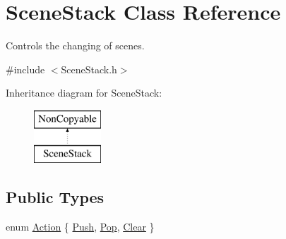 \hypertarget{class_scene_stack}{}\section{Scene\+Stack Class Reference}
\label{class_scene_stack}


Controls the changing of scenes.  




{\ttfamily \#include $<$Scene\+Stack.\+h$>$}

Inheritance diagram for Scene\+Stack\+:\begin{figure}[H]
\begin{center}
\leavevmode
\includegraphics[height=2.000000cm]{class_scene_stack}
\end{center}
\end{figure}
\subsection*{Public Types}
\begin{DoxyCompactItemize}
\item 
enum \hyperlink{class_scene_stack_ab8644e038aad992c6776dc3fb5fcc1f9}{Action} \{ \hyperlink{class_scene_stack_ab8644e038aad992c6776dc3fb5fcc1f9a6cd7480d27e0a88a4b67e2186757358d}{Push}, 
\hyperlink{class_scene_stack_ab8644e038aad992c6776dc3fb5fcc1f9a1d86b0e7cf0989e5717f70598e74fa95}{Pop}, 
\hyperlink{class_scene_stack_ab8644e038aad992c6776dc3fb5fcc1f9af03df5d6746e57023c22bb3548b93779}{Clear}
 \}
\end{DoxyCompactItemize}
